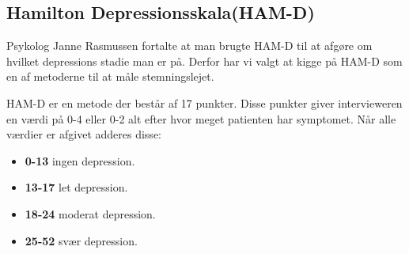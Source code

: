 \subsection{Hamilton Depressionsskala(HAM-D)}
Psykolog Janne Rasmussen fortalte at man brugte HAM-D til at afgøre om hvilket depressions stadie man er på.\cite[Afsnit 1.3, Møde med Psykolog Janne Rasmussen]{faelles}
Derfor har vi valgt at kigge på HAM-D som en af metoderne til at måle stemningslejet.

HAM-D er en metode der består af 17 punkter.
Disse punkter giver intervieweren en værdi på 0-4 eller 0-2 alt efter hvor meget patienten har symptomet.
Når alle værdier er afgivet adderes disse:
\begin{itemize}
	\item \textbf{0-13} ingen depression.
	\item \textbf{13-17} let depression.
	\item \textbf{18-24} moderat depression.
	\item \textbf{25-52} svær depression.
\end{itemize}

